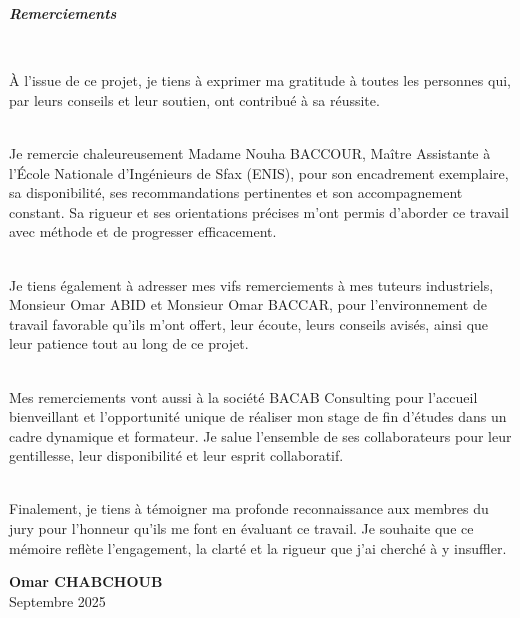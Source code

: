 
\newpage
\thispagestyle{MyStyle}
\vspace*{1cm}
\begin{center}{\selectfont
\Huge{\textit{\textbf{Remerciements}}}}
\end{center} \vspace*{0.5cm}
\begin{center}
\itshape
~\par À l’issue de ce projet, je tiens à exprimer ma gratitude à toutes les personnes qui, par leurs conseils et leur soutien, ont contribué à sa réussite.\\
~\par Je remercie chaleureusement Madame Nouha BACCOUR, Maître Assistante à l’École Nationale d’Ingénieurs de Sfax (ENIS), pour son encadrement exemplaire, sa disponibilité, ses recommandations pertinentes et son accompagnement constant. Sa rigueur et ses orientations précises m’ont permis d’aborder ce travail avec méthode et de progresser efficacement.\\
~\par Je tiens également à adresser mes vifs remerciements à mes tuteurs industriels, Monsieur Omar ABID et Monsieur Omar BACCAR, pour l’environnement de travail favorable qu’ils m’ont offert, leur écoute, leurs conseils avisés, ainsi que leur patience tout au long de ce projet.\\
~\par Mes remerciements vont aussi à la société BACAB Consulting pour l’accueil bienveillant et l’opportunité unique de réaliser mon stage de fin d’études dans un cadre dynamique et formateur. Je salue l’ensemble de ses collaborateurs pour leur gentillesse, leur disponibilité et leur esprit collaboratif.\\
~\par Finalement, je tiens à témoigner ma profonde reconnaissance aux membres du jury pour l’honneur qu’ils me font en évaluant ce travail. Je souhaite que ce mémoire reflète l’engagement, la clarté et la rigueur que j’ai cherché à y insuffler.\\[2cm]
\end{center}
\begin{flushright}
\textbf{Omar CHABCHOUB}\\
Septembre 2025
\end{flushright}
